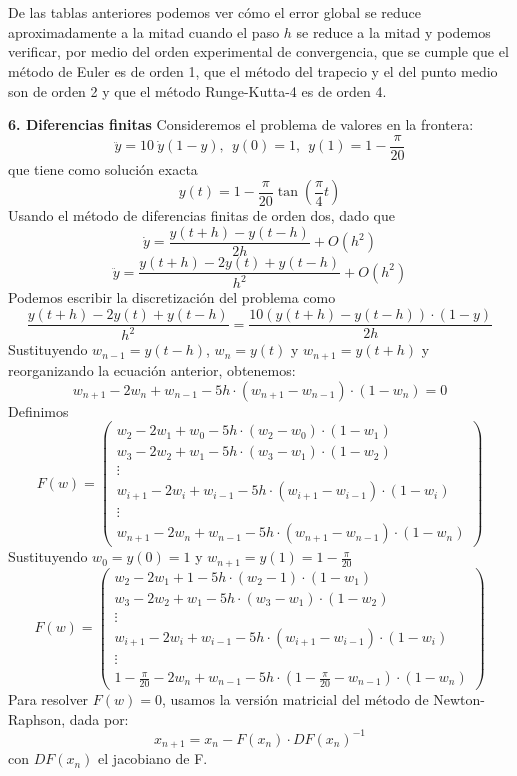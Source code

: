 \documentclass[11pt]{article}
\begin{document}
\\
\\

\newpage
De las tablas anteriores podemos ver cómo el error global se reduce aproximadamente a la mitad cuando el paso $h$ se reduce a la mitad y podemos verificar, por medio del orden experimental de convergencia, que se cumple que el método de Euler es de orden 1, que el método del trapecio y el del punto medio son de orden 2 y que el método Runge-Kutta-4 es de orden 4.

$ $\\
\noindent
\textbf{6. Diferencias finitas}
\newline
Consideremos el problema de valores en la frontera:
$$
\ddot{y} = 10 \ \dot{y} (1-y), \ \ y(0) = 1,  \ \ y(1) = 1 - \frac{\pi}{20}
$$
que tiene como solución exacta
$$
y(t) = 1 - \frac{\pi}{20} \tan \left( \frac{\pi}{4} t \right)
$$
Usando el método de diferencias finitas de orden dos, dado que
$$
\dot{y} = \frac{y(t+h)-y(t-h)}{2h} + O(h^2)
$$
$$
\ddot{y} = \frac{y(t+h)-2y(t)+y(t-h)}{h^2} + O(h^2)
$$
Podemos escribir la discretización del problema como
$$
\frac{y(t+h)-2y(t)+y(t-h)}{h^2} = \frac{10(y(t+h)-y(t-h)) \cdot (1-y)}{2h} 
$$
Sustituyendo $w_{n-1} = y(t-h)$, $w_{n} = y(t)$ y $w_{n+1} = y(t+h)$ y reorganizando la ecuación anterior, obtenemos:
$$
w_{n+1}-2w_{n}+w_{n-1} - 5h \cdot (w_{n+1} - w_{n-1}) \cdot (1-w_{n}) = 0
$$
Definimos
$$
F(w) = 
\begin{pmatrix}
w_{2}-2w_{1}+w_{0} - 5h \cdot (w_{2} - w_{0}) \cdot (1-w_{1}) \\
w_{3}-2w_{2}+w_{1} - 5h \cdot (w_{3} - w_{1}) \cdot (1-w_{2})\\
\vdots \\
w_{i+1}-2w_{i}+w_{i-1} - 5h \cdot (w_{i+1} - w_{i-1}) \cdot (1-w_{i}) \\
\vdots \\
w_{n+1}-2w_{n}+w_{n-1} - 5h \cdot (w_{n+1} - w_{n-1}) \cdot (1-w_{n})
\end{pmatrix}
$$
Sustituyendo $w_0 = y(0) = 1 $ y $w_{n+1} = y(1) = 1 - \frac{\pi}{20}$
$$
F(w) = 
\begin{pmatrix}
w_{2}-2w_{1}+1 - 5h \cdot (w_{2} - 1) \cdot (1-w_{1}) \\
w_{3}-2w_{2}+w_{1} - 5h \cdot (w_{3} - w_{1}) \cdot (1-w_{2})\\
\vdots \\
w_{i+1}-2w_{i}+w_{i-1} - 5h \cdot (w_{i+1} - w_{i-1}) \cdot (1-w_{i}) \\
\vdots \\
1 - \frac{\pi}{20}-2w_{n}+w_{n-1} - 5h \cdot (1 - \frac{\pi}{20} - w_{n-1}) \cdot (1-w_{n})
\end{pmatrix}
$$
Para resolver $F(w) = 0$, usamos la versión matricial del método de Newton-Raphson, dada por:
$$
x_{n+1} = x_n - F(x_n) \cdot DF(x_n)^{-1}
$$
con $DF(x_n)$ el jacobiano de F.
\end{document}
